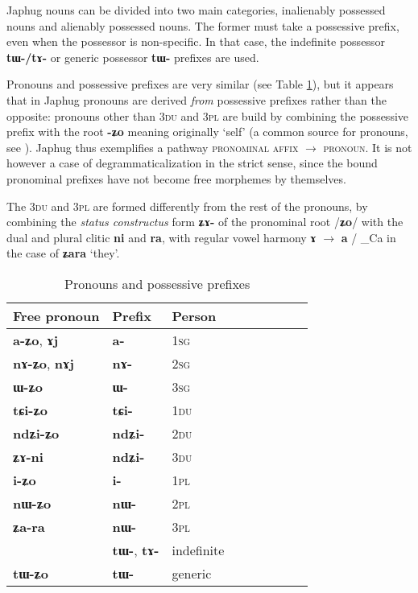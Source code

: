 \documentclass[oldfontcommands,oneside,a4paper,11pt]{article}
\newcommand{\ipa}[1]{\mbox{\phon\textbf{#1}}} %
\begin{document}
Japhug  nouns can be divided into two main categories, inalienably possessed nouns and alienably possessed nouns. The former must take a possessive prefix, even when the possessor is non-specific. In that case, the indefinite possessor \ipa{tɯ-/tɤ-} or generic possessor \ipa{tɯ-} prefixes are used.

Pronouns  and possessive prefixes are very similar (see Table \ref{tab:pronoun}), but it appears that in Japhug pronouns are derived \textit{from} possessive prefixes rather than the opposite: pronouns other than \textsc{3du} and \textsc{3pl} are build by combining the possessive prefix with the root \ipa{-ʑo} meaning originally `self' (a common source for pronouns, see \citealt{heine11pronoms}). Japhug thus exemplifies a pathway \textsc{pronominal affix} $\rightarrow$ \textsc{pronoun}. It is not however a case of degrammaticalization in the strict sense, since the bound pronominal prefixes have not become free morphemes by themselves.

The \textsc{3du} and \textsc{3pl} are formed differently from the rest of the pronouns, by combining the \textit{status constructus} form \ipa{ʑɤ-} of the pronominal root /\ipa{ʑo}/ with the dual and plural clitic \ipa{ni} and \ipa{ra}, with regular vowel harmony \ipa{ɤ} $\rightarrow$ \ipa{a} / \_Ca in the case of \ipa{ʑara} `they'.
 
 \begin{table}[H] \centering
\caption{Pronouns and possessive prefixes }\label{tab:pronoun}
\begin{tabular}{lllllllll} 
\toprule
 Free pronoun & Prefix & Person\\
\midrule
 \ipa{a-ʑo},    \ipa{ɤj} &	\ipa{a-}  &		1\textsc{sg} \\
\ipa{nɤ-ʑo},  \ipa{nɤj} &	\ipa{nɤ-}  &			2\textsc{sg}\\
\ipa{ɯ-ʑo}  &	\ipa{ɯ-}  &			3\textsc{sg}\\
\midrule
\ipa{tɕi-ʑo}  &	\ipa{tɕi-}  &			1\textsc{du} \\
\ipa{ndʑi-ʑo}  &	\ipa{ndʑi-}  &		2\textsc{du} \\	
\ipa{ʑɤ-ni}  &	\ipa{ndʑi-}  &		3\textsc{du} \\	
\midrule
\ipa{i-ʑo}    &	\ipa{i-}  &			1\textsc{pl} \\
\ipa{nɯ-ʑo}   &	\ipa{nɯ-}  &			2\textsc{pl} \\
\ipa{ʑa-ra}  &	\ipa{nɯ-}  &			3\textsc{pl} \\
\midrule
&  \ipa{tɯ-},  \ipa{tɤ-} & indefinite \\
\ipa{tɯ-ʑo} & \ipa{tɯ-}   &  generic\\
\bottomrule
\end{tabular}
\end{table}
 
\end{document}
